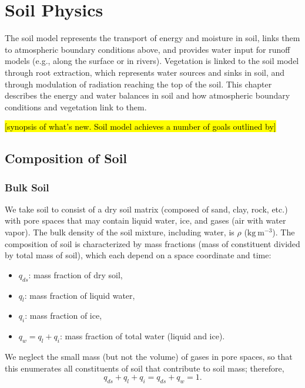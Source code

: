 \documentclass[twoside,10pt]{report}
\begin{document}
\chapter{Soil Physics}\label{c:soil}

The soil model represents the transport of energy and moisture in soil, links them to atmospheric boundary conditions above, and provides water input for runoff models (e.g., along the surface or in rivers). Vegetation is linked to the soil model through root extraction, which represents water sources and sinks in soil, and through modulation of radiation reaching the top of the soil.  This chapter describes the energy and water balances in soil and how atmospheric boundary conditions and vegetation link to them.

\hl{[synopsis of what's new. Soil model achieves a number of goals outlined by]} \citep{Clark15a}

\section{Composition of Soil}

\subsection{Bulk Soil}

We take soil to consist of a dry soil matrix (composed of sand, clay, rock, etc.) with pore spaces that may contain liquid water, ice, and gases (air with water vapor). The bulk density of the soil mixture, including water, is $\rho$ ($\mathrm{kg~m^{-3}}$). The composition of soil is characterized by mass fractions (mass of constituent divided by total mass of soil), which each depend on a space coordinate and time:
\begin{itemize}
    \item $q_{ds}$: mass fraction of dry soil,
    \item $q_l$: mass fraction of liquid water,
    \item $q_i$: mass fraction of ice,
    \item $q_w = q_l + q_i$: mass fraction of total water (liquid and ice).
\end{itemize}
We neglect the small mass (but not the volume) of gases in pore spaces, so that this enumerates all constituents of soil that contribute to soil mass; therefore, 
\[
q_{ds} + q_l + q_i = q_{ds} + q_w = 1.
\]
\end{document}
